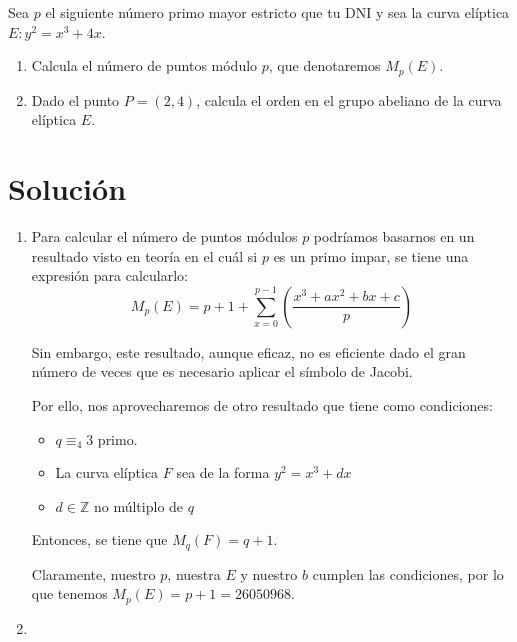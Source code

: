 	Sea $p$ el siguiente número primo mayor estricto que tu DNI y sea la curva elíptica $E: y^2 = x^3 + 4x$.
	\begin{enumerate}
		\item Calcula el número de puntos módulo $p$, que denotaremos $M_p(E)$.
		\item Dado el punto $P = (2,4)$, calcula el orden en el grupo abeliano de la curva elíptica $E$.
	\end{enumerate}
	
\section*{Solución}
	\begin{enumerate}
		\item Para calcular el número de puntos módulos $p$ podríamos basarnos en un resultado visto en teoría
		en el cuál si $p$ es un primo impar, se tiene una expresión para calcularlo:
		$$\displaystyle M_p(E) = p + 1 + \sum_{x=0}^{p-1} \left( \frac{x^3 + ax^2 + bx + c}{p} \right)$$
		
		Sin embargo, este resultado, aunque eficaz, no es eficiente dado el gran número de veces que es necesario
		aplicar el símbolo de Jacobi.
		
		Por ello, nos aprovecharemos de otro resultado que tiene como condiciones:
		\begin{itemize}
			\item $q \equiv_4 3$ primo.
			\item La curva elíptica $F$ sea de la forma $y^2 = x^3 + dx$
			\item $d \in \mathbb{Z}$ no múltiplo de $q$
		\end{itemize}
		Entonces, se tiene que $M_q(F) = q+1$.

		Claramente, nuestro $p$, nuestra $E$ y nuestro $b$ cumplen las condiciones, por lo que tenemos $M_p(E)
		= p+1 = 26050968$.
		
		\item 
	\end{enumerate}